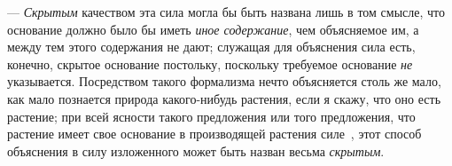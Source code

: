 — {\em Скрытым} качеством эта сила могла бы быть
названа лишь в том смысле, что основание должно было бы иметь
{\em иное содержание}, чем объясняемое им, а между тем
этого содержания не дают; служащая для объяснения сила есть, конечно,
скрытое основание постольку, поскольку требуемое основание
{\em не} указывается. Посредством такого формализма
нечто объясняется столь же мало, как мало познается природа какого-нибудь
растения, если я скажу, что оно есть растение; при всей ясности такого
предложения или того предложения, что растение имеет свое основание в
производящей растения
силе~,
этот способ объяснения в силу изложенного может быть назван весьма
{\em скрытым}.

